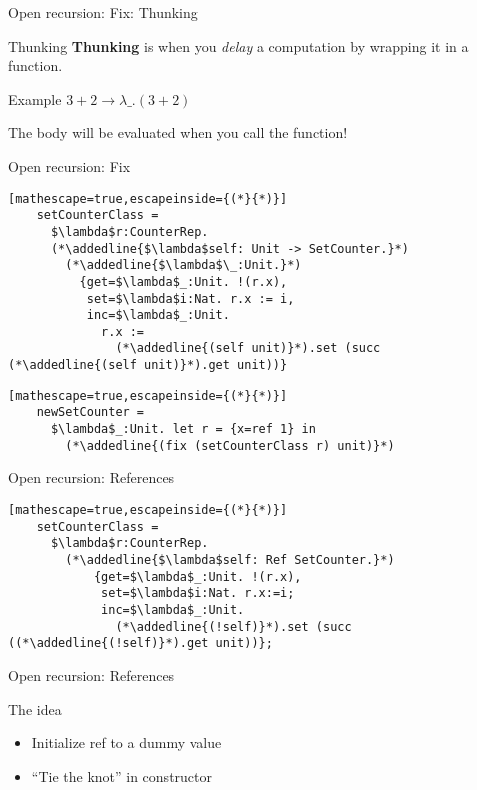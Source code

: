 \documentclass[presentation,xcolor=svgnames]{beamer}
\begin{document}
\begin{frame}[fragile]{Open recursion: Fix: Thunking}
  \begin{block}{Thunking}
  \textbf{Thunking} is when you \emph{delay} a computation by wrapping it in a function.
  \end{block}

  \begin{block}{Example}
  $3 + 2 \rightarrow \lambda \_. (3 + 2)$

  The body will be evaluated when you call the function!
  \end{block}


\end{frame}

\begin{frame}[fragile]{Open recursion: Fix}
  \begin{lstlisting}[mathescape=true,escapeinside={(*}{*)}]
    setCounterClass =
      $\lambda$r:CounterRep.
      (*\addedline{$\lambda$self: Unit -> SetCounter.}*)
        (*\addedline{$\lambda$\_:Unit.}*)
          {get=$\lambda$_:Unit. !(r.x),
           set=$\lambda$i:Nat. r.x := i,
           inc=$\lambda$_:Unit.
             r.x :=
               (*\addedline{(self unit)}*).set (succ (*\addedline{(self unit)}*).get unit))}
  \end{lstlisting}
  \begin{lstlisting}[mathescape=true,escapeinside={(*}{*)}]
    newSetCounter =
      $\lambda$_:Unit. let r = {x=ref 1} in
        (*\addedline{(fix (setCounterClass r) unit)}*)
  \end{lstlisting}
\end{frame}

\begin{frame}[fragile]{Open recursion: References}
  \begin{lstlisting}[mathescape=true,escapeinside={(*}{*)}]
    setCounterClass =
      $\lambda$r:CounterRep.
        (*\addedline{$\lambda$self: Ref SetCounter.}*)
            {get=$\lambda$_:Unit. !(r.x),
             set=$\lambda$i:Nat. r.x:=i;
             inc=$\lambda$_:Unit.
               (*\addedline{(!self)}*).set (succ ((*\addedline{(!self)}*).get unit))};
  \end{lstlisting}
\end{frame}

\begin{frame}{Open recursion: References}
  \begin{block}{The idea}
    \begin{itemize}
    \item Initialize ref to a dummy value
    \item ``Tie the knot'' in constructor
    \end{itemize}
  \end{block}
\end{frame}
\end{document}
